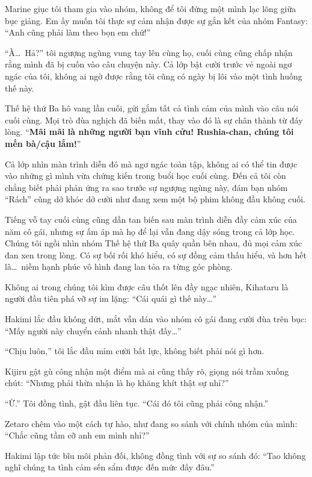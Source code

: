 \documentclass[../main.tex]{subfiles}
\begin{document}
Marine giục tôi tham gia vào nhóm, không để tôi đứng một mình lạc lõng giữa bục giảng. Em ấy muốn tôi thực sự cảm nhận được sự gắn kết của nhóm Fantasy: ``Anh cũng phải làm theo bọn em chứ!''

``À\dots\ Hả?'' tôi ngượng ngùng vung tay lên cùng họ, cuối cùng cũng chấp nhận rằng mình đã bị cuốn vào câu chuyện này. Cả lớp bật cười trước vẻ ngoài ngơ ngác của tôi, không ai ngờ được rằng tôi cũng có ngày bị lôi vào một tình huống thế này.

Thế hệ thứ Ba hô vang lần cuối, gửi gắm tất cả tình cảm của mình vào câu nói cuối cùng. Mọi trò đùa nghịch đã biến mất, thay vào đó là sự chân thành từ đáy lòng. ``\textbf{Mãi mãi là những người bạn vĩnh cửu! Rushia-chan, chúng tôi mến bà/cậu lắm!}''

Cả lớp nhìn màn trình diễn đó mà ngơ ngác toàn tập, không ai có thể tin được vào những gì mình vừa chứng kiến trong buổi học cuối cùng. Đến cả tôi còn chẳng biết phải phản ứng ra sao trước sự ngượng ngùng này, đám bạn nhóm ``Rách'' cũng dở khóc dở cười như đang xem một bộ phim không đầu không cuối.

Tiếng vỗ tay cuối cùng cũng dần tan biến sau màn trình diễn đầy cảm xúc của năm cô gái, nhưng sự ấm áp mà họ để lại vẫn đang dậy sóng trong cả lớp học. Chúng tôi ngồi nhìn nhóm Thế hệ thứ Ba quây quần bên nhau, đủ mọi cảm xúc đan xen trong lòng. Có sự bối rối khó hiểu, có sự đồng cảm thấu hiểu, và hơn hết là\dots\ niềm hạnh phúc vô hình đang lan tỏa ra từng góc phòng.

Không ai trong chúng tôi kìm được câu thốt lên đầy ngạc nhiên, Kihataru là người đầu tiên phá vỡ sự im lặng: ``Cái quái gì thế này\dots''

Hakimi lắc đầu không dứt, mắt vẫn dán vào nhóm cô gái đang cười đùa trên bục: ``Mấy người này chuyển cảnh nhanh thật đấy\dots''

``Chịu luôn,'' tôi lắc đầu mỉm cười bất lực, không biết phải nói gì hơn.

Kijiru gật gù công nhận một điểm mà ai cũng thấy rõ, giọng nói trầm xuống chút: ``Nhưng phải thừa nhận là họ khăng khít thật sự nhỉ?''

``Ừ.'' Tôi đồng tình, gật đầu liên tục. ``Cái đó tôi cũng phải công nhận.''

Zetaro chêm vào một cách tự hào, như đang so sánh với chính nhóm của mình: ``Chắc cũng tầm cỡ anh em mình nhỉ?''

Hakimi lập tức bĩu môi phản đối, không đồng tình với sự so sánh đó: ``Tao không nghĩ chúng ta tình cảm sến sẩm được đến mức đấy đâu.''
\end{document}
